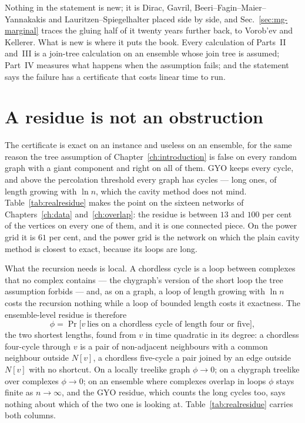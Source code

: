 Nothing in the statement is new; it is Dirac, Gavril, Beeri--Fagin--Maier--%
Yannakakis and Lauritzen--Spiegelhalter placed side by side, and
Sec.~\ref{sec:mg-marginal} traces the gluing half of it twenty years
further back, to Vorob'ev and Kellerer. What is new is
where it puts the book. Every calculation of Parts~II and~III is a
join-tree calculation on an ensemble whose join tree is assumed; Part~IV
measures what happens when the assumption fails; and the statement says the
failure has a certificate that costs linear time to run.

\section{A residue is not an obstruction}
\label{sec:residue}

The certificate is exact on an instance and useless on an ensemble, for the
same reason the tree assumption of Chapter~\ref{ch:introduction} is false on
every random graph with a giant component and right on all of them. GYO
keeps every cycle, and above the percolation threshold every graph has cycles
--- long ones, of length growing with $\ln n$, which the cavity method does
not mind. Table~\ref{tab:realresidue} makes the point on the sixteen networks
of Chapters~\ref{ch:data} and~\ref{ch:overlap}: the residue is between
$13$ and $100$ per cent of the vertices on every one of them, and it is
one connected piece. On the power grid it is $61$ per cent, and the power
grid is the network on which the plain cavity method is closest to exact,
because its loops are long.

What the recursion needs is local. A chordless cycle is a loop between
complexes that no complex contains --- the chygraph's version of the short
loop the tree assumption forbids --- and, as on a graph, a loop of length
growing with $\ln n$ costs the recursion nothing while a loop of bounded
length costs it exactness. The ensemble-level residue is therefore
\begin{equation}
  \phi=\Pr\bigl[v\ \text{lies on a chordless cycle of length four or five}\bigr],
  \label{eq:phishort}
\end{equation}
the two shortest lengths, found from $v$ in time quadratic in its degree: a
chordless four-cycle through $v$ is a pair of non-adjacent neighbours with a
common neighbour outside $N[v]$, a chordless five-cycle a pair joined by an
edge outside $N[v]$ with no shortcut. On a locally treelike graph $\phi\to0$;
on a chygraph treelike over complexes $\phi\to0$; on an ensemble where
complexes overlap in loops $\phi$ stays finite as $n\to\infty$, and the GYO
residue, which counts the long cycles too, says nothing about which of the
two one is looking at. Table~\ref{tab:realresidue} carries both columns.


